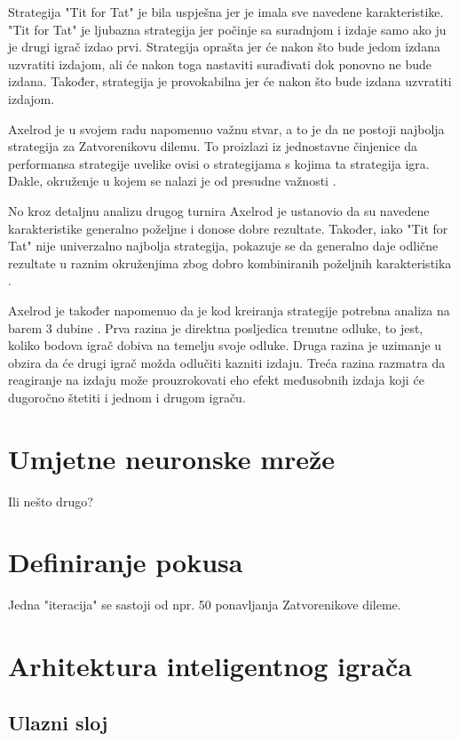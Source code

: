 \documentclass[zavrsnirad]{fer}
\begin{document}
		Strategija "Tit for Tat" je bila uspješna jer je imala sve navedene karakteristike. "Tit for Tat" je ljubazna strategija jer počinje sa suradnjom i izdaje samo ako ju je drugi igrač izdao prvi. Strategija oprašta jer će nakon što bude jedom izdana uzvratiti izdajom, ali će nakon toga nastaviti surađivati dok ponovno ne bude izdana. Također, strategija je provokabilna jer će nakon što bude izdana uzvratiti izdajom.
	
		Axelrod je u svojem radu napomenuo važnu stvar, a to je da ne postoji najbolja strategija za Zatvorenikovu dilemu. To proizlazi iz jednostavne činjenice da performansa strategije uvelike ovisi o strategijama s kojima ta strategija igra. Dakle, okruženje u kojem se nalazi je od presudne važnosti \cite{1980Axelrod1}.
	
		No kroz detaljnu analizu drugog turnira Axelrod je ustanovio da su navedene karakteristike generalno poželjne i donose dobre rezultate. Također, iako "Tit for Tat" nije univerzalno najbolja strategija, pokazuje se da generalno daje odlične rezultate u raznim okruženjima zbog dobro kombiniranih poželjnih karakteristika \cite{1980Axelrod2}.
	
		Axelrod je također napomenuo da je kod kreiranja strategije potrebna analiza na barem 3 dubine \cite{1980Axelrod1}. Prva razina je direktna posljedica trenutne odluke, to jest, koliko bodova igrač dobiva na temelju svoje odluke. Druga razina je uzimanje u obzira da će drugi igrač možda odlučiti kazniti izdaju. Treća razina razmatra da reagiranje na izdaju može prouzrokovati eho efekt međusobnih izdaja koji će dugoročno štetiti i jednom i drugom igraču.

\section{Umjetne neuronske mreže}

	Ili nešto drugo?

\section{Definiranje pokusa}

	Jedna "iteracija" se sastoji od npr. 50 ponavljanja Zatvorenikove dileme.

\section{Arhitektura inteligentnog igrača}

\subsection{Ulazni sloj}
\end{document}
